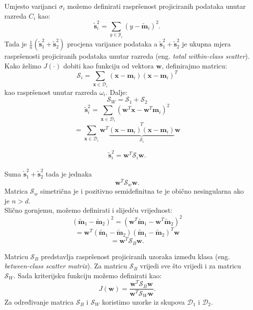 \documentclass{book}
\begin{document}
Umjesto varijanci $\sigma_i$  možemo definirati raspršenost projiciranih
podataka unutar razreda $C_i$ kao:
$$ \widetilde{\mathbf{s}}^2_i = \sum\limits_{y \in \mathcal{Y}_i}(y -
\widetilde{\mathbf{m}}_i)^2. $$
Tada je $\frac{1}{n}( \widetilde{\mathbf{s}}^2_1 + \widetilde{\mathbf{s}}^2_2)$
procjena varijance podataka a $\widetilde{\mathbf{s}}^2_1 +
\widetilde{\mathbf{s}}^2_2$ je ukupna mjera raspršenosti projiciranih podataka
unutar razreda (eng. \textit{total within-class scatter}). \\

Kako želimo $J(\cdot)$ dobiti kao funkciju od vektora $\mathbf{w}$, definirajmo
matricu:
$$ \mathcal{S}_i = \sum\limits_{\mathbf{x} \in \mathcal{D}_i}(\mathbf{x} -
\mathbf{m}_i)(\mathbf{x} - \mathbf{m}_i)^T $$
kao raspršenost unutar razreda $\omega_i$. 
Dalje: 
$$ \mathcal{S}_W = \mathcal{S}_1 + \mathcal{S}_2 $$
$$  \widetilde{\mathbf{s}}^2_i = \sum\limits_{\mathbf{x} \in
\mathcal{D}_i}(\mathbf{w}^T\mathbf{x} - \mathbf{w}^T\mathbf{m}_i)^2 $$
$$ = \sum\limits_{\mathbf{x} \in
\mathcal{D}_i}\mathbf{w}^T\underbrace{(\mathbf{x} -  \mathbf{m}_i)(\mathbf{x} -
\mathbf{m}_i)}_{\mathcal{S}_i}^T\mathbf{w} $$
 
$$  \widetilde{\mathbf{s}}^2_i = \mathbf{w}^T\mathcal{S}_i\mathbf{w}. $$ \\

Suma $\widetilde{\mathbf{s}}^2_1 + \widetilde{\mathbf{s}}^2_2$ tada je jednaka 
$$ \mathbf{w}^T \mathcal{S}_w \mathbf{w} .$$ 
Matrica $\mathcal{S}_w$ simetrična je i pozitivno semidefinitna te je obično
nesingularna ako je $n>d$. \\

Slično gornjemu, možemo definirati i slijedću vrijednost:
$$ (\widetilde{\mathbf{m}}_1 - \widetilde{\mathbf{m}}_2)^2 =
(\mathbf{w}^T\widetilde{\mathbf{m}}_1 - \mathbf{w}^T\widetilde{\mathbf{m}}_2)^2
$$
$$ = \mathbf{w}^T(\widetilde{\mathbf{m}}_1 -
\widetilde{\mathbf{m}}_2)(\widetilde{\mathbf{m}}_1 -
\widetilde{\mathbf{m}}_2)^T\mathbf{w} $$ 
$$ = \mathbf{w}^T\mathcal{S}_B\mathbf{w}.$$

Matricu $\mathcal{S}_B$ predstavlja raspršenost projiciranih uzoraka između
klasa (eng. \textit{between-class scatter matrix}).
Za matricu $\mathcal{S}_B$ vrijedi sve što vrijedi i za matricu $\mathcal{S}_W$.
Sada kriterijsku funkciju možemo definirati kao: 
$$ J(\mathbf{w}) =
\frac{\mathbf{w}^T\mathcal{S}_B\mathbf{w}}{\mathbf{w}^T\mathcal{S}_W\mathbf{w}}.
$$
Za određivanje matrica $\mathcal{S}_B$ i $\mathcal{S}_W$ koristimo uzorke iz
skupova $\mathcal{D}_1$ i $\mathcal{D}_2$. \\
\end{document}
